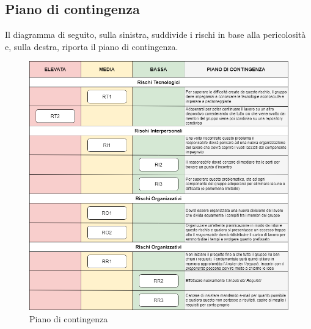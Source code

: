 \subsection{Piano di contingenza} \label{piano_contingenza}
Il diagramma di seguito, sulla sinistra, suddivide i rischi in base alla pericolosità e, sulla destra, riporta il
piano di contingenza.
\begin{figure}[H]
	\centering
  \includegraphics[scale=0.6]{immagini/piano_di_contingenza.png}
  \caption{Piano di contingenza}
\end{figure}